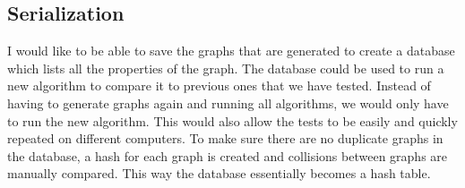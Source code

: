 \documentclass{article}
\begin{document}
\subsection{Serialization}
I would like to be able to save the graphs that are generated to create a database which lists all the properties of the graph. The database could be used to run a new algorithm to compare it to previous ones that we have tested. Instead of having to generate graphs again and running all algorithms, we would only have to run the new algorithm. This would also allow the tests to be easily and quickly repeated on different computers. 
To make sure there are no duplicate graphs in the database, a hash for each graph is created and collisions between graphs are manually compared. This way the database essentially becomes a hash table.
\end{document}
